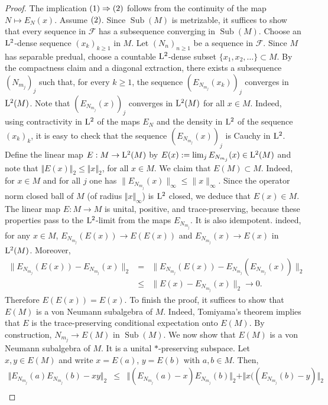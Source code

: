 \documentclass[12pt]{amsart} %
\theoremstyle{plain}
\theoremstyle{definition}
\newcommand{\LL}{{\rm L}}
\DeclareMathOperator{\Sub}{Sub}
\begin{document}
\begin{proof}
The implication ${\rm(1)}\Rightarrow{\rm(2)}$ follows from the continuity of
the map $N\mapsto E_N(x)$. Assume ${\rm(2)}$. Since $\Sub(M)$ is metrizable, it suffices to show that every sequence in $\mathcal{F}$ has a subsequence converging in $\Sub(M)$. Choose an $\LL^2$-dense sequence
$(x_k)_{k\geq1}$ in $M$. Let $(N_n)_{n\geq1}$ be a sequence in
$\mathcal F$. Since \(M\) has separable
predual, choose a countable \({\rm L}^2\)-dense subset $\{x_1,x_2,\dots\}\subset M$. By the compactness claim and a diagonal extraction, there exists a subsequence $(N_{m_j})_j$ such that, for every \(k\geq1\), the sequence $(E_{N_{m_j}}(x_k))_j$ converges in \({\rm L}^2(M)\). Note that $(E_{N_{m_j}}(x))_j$ converges in \({\rm L}^2(M)\) for all $x\in M$. Indeed, using contractivity in ${\rm L}^2$ of the maps $E_N$ and the density in ${\rm L}^2$ of the sequence $(x_k)_k$, it is easy to check that the sequence $(E_{N_{m_j}}(x))_j$  is Cauchy in ${\rm L}^2$. Define the linear map $E:M\to \LL^2(M)$ by $E(x):=\lim_jE_{N_{m_j}}(x)\in{\rm L}^2(M)$ and note that $\Vert E(x)\Vert_2\leq\Vert x\Vert_2$, for all $x\in M$. We claim that \(E(M)\subset M\). Indeed, for \(x\in M\) and for all $j$ one has  $\|E_{N_{m_j}}(x)\|_\infty\leq \|x\|_\infty$. Since the operator norm closed ball of $M$ (of radius $\Vert x\Vert_\infty$) is ${\rm L}^2$ closed, we deduce that $E(x)\in M$. The linear map \(E:M\to M\) is unital, positive, and trace-preserving, because
these properties pass to the \({\rm L}^2\)-limit from the maps \(E_{N_{m_j}}\). It is
also idempotent. indeed, for any $x\in M$, $E_{N_{m_j}}(E(x))\to E(E(x))$ and $E_{N_{m_j}}(x)\to E(x)$ in ${\rm L}^2(M)$. Moreover, 
\begin{eqnarray*}
\|E_{N_{m_j}}(E(x))-E_{N_{m_j}}(x)\|_2&=&\|E_{N_{m_j}}(E(x))-E_{N_{m_j}}(E_{N_{m_j}}(x))\|_2\\
&\leq&\|E(x)-E_{N_{m_j}}(x)\|_2\to 0.
\end{eqnarray*}
Therefore $ E(E(x))=E(x)$. To finish the proof, it suffices to show that $E(M)$ is a von Neumann subalgebra of $M$. Indeed, Tomiyama's theorem implies that \(E\)
is the trace-preserving conditional expectation onto $E(M)$. By construction, $N_{m_j}\to E(M)$ in $\Sub(M)$. 
\medskip
\noindent We now show that $E(M)$ is a von Neumann subalgebra of $M$. It is a unital $*$-preserving subspace. Let $x,y\in E(M)$ and write $x=E(a)$, $y=E(b)$ with $a,b\in M$. Then,
\begin{eqnarray*}
\Vert E_{N_{m_j}}(a)E_{N_{m_j}}(b)-xy\Vert_2&\leq &\Vert (E_{N_{m_j}}(a)-x)E_{N_{m_j}}(b)\Vert_2+\Vert x((E_{N_{m_j}}(b)-y)\Vert_2\\

\end{eqnarray*}
\end{proof}
\end{document}
